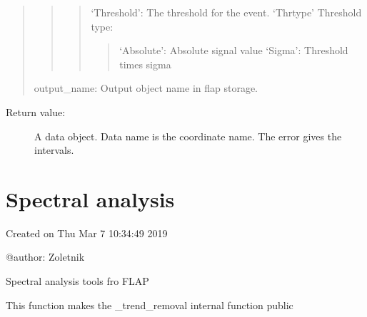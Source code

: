 \documentclass[letterpaper,10pt,english]{sphinxmanual}
\begin{document}
\begin{fulllineitems}
\begin{quote}
\begin{quote}
\begin{quote}
\begin{description}
\end{description}

‘Threshold’: The threshold for the event.
‘Thr\sphinxhyphen{}type’ Threshold type:
\begin{quote}

‘Absolute’: Absolute signal value
‘Sigma’: Threshold times sigma
\end{quote}
\end{quote}
\end{quote}

output\_name: Output object name in flap storage.
\end{quote}
\begin{description}
\item[{Return value:}] \leavevmode
A data object. Data name is the coordinate name. The error gives the intervals.

\end{description}

\end{fulllineitems}



\section{Spectral analysis}
\label{\detokenize{spectral_analysis:module-flap.spectral_analysis}}\label{\detokenize{spectral_analysis:spectral-analysis}}\label{\detokenize{spectral_analysis::doc}}
Created on Thu Mar  7 10:34:49 2019

@author: Zoletnik

Spectral analysis tools fro FLAP

\begin{fulllineitems}
\label{\detokenize{spectral_analysis:flap.spectral_analysis.trend_removal_func}}
This function makes the \_trend\_removal internal function public

\end{fulllineitems}
\end{document}
